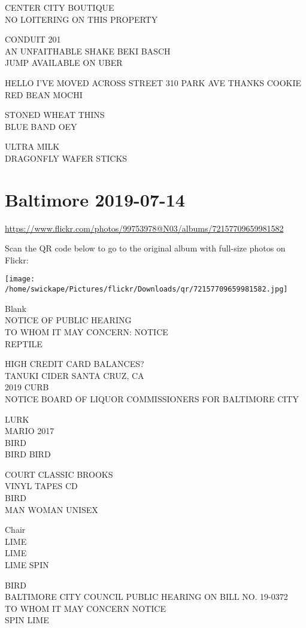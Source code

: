 \documentclass[10pt,letterpaper]{article}
\begin{document}
CENTER CITY BOUTIQUE\\
NO LOITERING ON THIS PROPERTY

CONDUIT 201\\
AN UNFAITHABLE SHAKE BEKI BASCH\\
JUMP AVAILABLE ON UBER

HELLO I'VE MOVED ACROSS STREET 310 PARK AVE THANKS COOKIE\\
RED BEAN MOCHI

STONED WHEAT THINS\\
BLUE BAND OEY

ULTRA MILK\\
DRAGONFLY WAFER STICKS


\section*{Baltimore 2019-07-14}

\url{https://www.flickr.com/photos/99753978@N03/albums/72157709659981582}

Scan the QR code below to go to the original album with full-size photos on Flickr:

\texttt{[image: /home/swickape/Pictures/flickr/Downloads/qr/72157709659981582.jpg]}


Blank\\
NOTICE OF PUBLIC HEARING\\
TO WHOM IT MAY CONCERN: NOTICE\\
REPTILE

HIGH CREDIT CARD BALANCES?\\
TANUKI CIDER SANTA CRUZ, CA\\
2019 CURB\\
NOTICE BOARD OF LIQUOR COMMISSIONERS FOR BALTIMORE CITY

LURK\\
MARIO 2017\\
BIRD\\
BIRD BIRD

COURT CLASSIC BROOKS\\
VINYL TAPES CD\\
BIRD\\
MAN WOMAN UNISEX

Chair\\
LIME\\
LIME\\
LIME SPIN

BIRD\\
BALTIMORE CITY COUNCIL PUBLIC HEARING ON BILL NO. 19{-}0372\\
TO WHOM IT MAY CONCERN NOTICE\\
SPIN LIME
\end{document}

